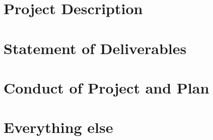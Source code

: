 \section{Project Description} \label{reqProDes}

\section{Statement of Deliverables} \label{reqDel}

\section{Conduct of Project and Plan} \label{reqConProPln}

\section{Everything else} \label{reqNotDecidedYet}
